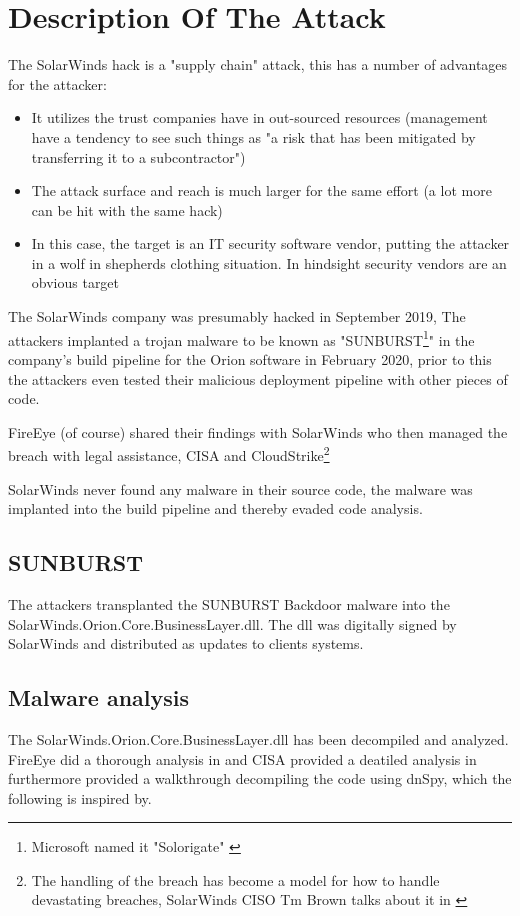 \documentclass[
	letterpaper, %
	10pt, %
	unnumberedsections, %
	twoside, %
]{LTJournalArticle}
\begin{document}
\section{Description Of The Attack} 
The SolarWinds hack is a "supply chain" attack, this has a number of advantages for the attacker:

\begin{itemize}
	\item It utilizes the trust companies have in out-sourced resources (management have a tendency to see such things as "a risk that has been mitigated by transferring it to a subcontractor") 
	\item The attack surface and reach is much larger for the same effort (a lot more can be hit with the same hack)
	\item In this case, the target is an IT security software vendor, putting the attacker in a wolf in shepherds clothing situation. In hindsight security vendors are an obvious target
\end{itemize} 

The SolarWinds company was presumably hacked in September 2019\cite{TechTargetSolarwinds}, The attackers implanted a trojan malware to be known as "SUNBURST\footnote{Microsoft named it "Solorigate" \cite{MicrosoftSolarwinds}}" in the company's build pipeline for the Orion software in February 2020, prior to this the attackers even tested their malicious deployment pipeline with other pieces of code\cite{orangematterSunburst}. 
\par
FireEye (of course) shared their findings with SolarWinds who then managed the breach with legal assistance, CISA and CloudStrike\footnote{The handling of the breach has become a model for how to handle devastating breaches, SolarWinds CISO Tm Brown talks about it in \cite{CISA_sunburst}}   

SolarWinds never found any malware in their source code, the malware was implanted into the build pipeline and thereby evaded code analysis. 

\subsection{SUNBURST}
The attackers transplanted the SUNBURST Backdoor malware into the SolarWinds.Orion.Core.BusinessLayer.dll\cite{Mandiant}. The dll was digitally signed by SolarWinds and distributed as updates to clients systems.

\subsection{Malware analysis}     
The SolarWinds.Orion.Core.BusinessLayer.dll has been decompiled and analyzed. FireEye did a thorough analysis in\cite{Mandiant} and CISA provided a deatiled analysis in \cite{CISA_sunburst} furthermore \cite{cybercdh} provided a walkthrough decompiling the code using dnSpy, which the following is inspired by.
\end{document}
